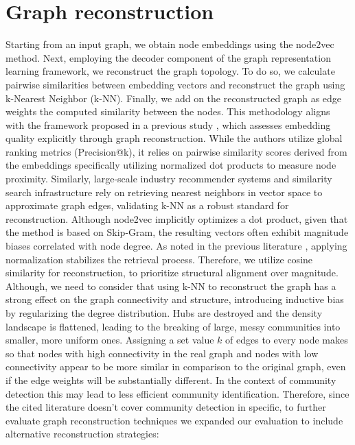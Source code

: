 \documentclass[a4paper,11pt]{article}
\begin{document}
\section{Graph reconstruction}
Starting from an input graph, we obtain node embeddings using the node2vec method. Next, employing the decoder component of the graph representation learning framework, we reconstruct the graph topology. To do so, we calculate pairwise similarities between embedding vectors and reconstruct the graph using k-Nearest Neighbor (k-NN). Finally, we add on the reconstructed graph as edge weights the computed similarity between the nodes.
This methodology aligns with the framework proposed in a previous study \cite{yip2023restore}, which assesses embedding quality explicitly through graph reconstruction. While the authors utilize global ranking metrics (Precision@k), it relies on pairwise similarity scores derived from the embeddings specifically utilizing normalized dot products to measure node proximity. Similarly, large-scale industry recommender systems \cite{ying2018graph} \cite{wang2018billion} and similarity search infrastructure \cite{johnson2019billion} rely on retrieving nearest neighbors in vector space to approximate graph edges, validating k-NN as a robust standard for reconstruction.
Although node2vec implicitly optimizes a dot product, given that the method is based on Skip-Gram, the resulting vectors often exhibit magnitude biases correlated with node degree. As noted in the previous literature \cite{ying2018graph} \cite{chanpuriyadeepwalking}, applying normalization stabilizes the retrieval process. Therefore, we utilize cosine similarity for reconstruction, to prioritize structural alignment over magnitude.
Although, we need to consider that using k-NN to reconstruct the graph has a strong effect on the graph connectivity and structure, introducing inductive bias by regularizing the degree distribution. Hubs are destroyed and the density landscape is flattened, leading to the breaking of large, messy communities into smaller, more uniform ones. Assigning a set value $k$ of edges to every node makes so that nodes with high connectivity in the real graph and nodes with low connectivity appear to be more similar in comparison to the original graph, even if the edge weights will be substantially different. In the context of community detection this may lead to less efficient community identification. Therefore, since the cited literature doesn't cover community detection in specific, to further evaluate graph reconstruction techniques we expanded our evaluation to include alternative reconstruction strategies:
\end{document}
